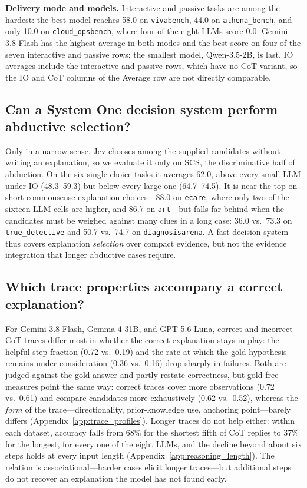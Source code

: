 \textbf{Delivery mode and models.} Interactive and passive tasks are among the hardest: the best model reaches 58.0 on \texttt{vivabench}, 44.0 on \texttt{athena\_bench}, and only 10.0 on \texttt{cloud\_opsbench}, where four of the eight LLMs score 0.0. Gemini-3.8-Flash has the highest average in both modes and the best score on four of the seven interactive and passive rows; the smallest model, Qwen-3.5-2B, is last. IO averages include the interactive and passive rows, which have no CoT variant, so the IO and CoT columns of the Average row are not directly comparable.

\subsection{Can a System One decision system perform abductive selection?}
\label{sec:jev}

Only in a narrow sense. Jev chooses among the supplied candidates without writing an explanation, so we evaluate it only on SCS, the discriminative half of abduction. On the six single-choice tasks it averages 62.0, above every small LLM under IO (48.3--59.3) but below every large one (64.7--74.5). It is near the top on short commonsense explanation choices---88.0 on \texttt{ecare}, where only two of the sixteen LLM cells are higher, and 86.7 on \texttt{art}---but falls far behind when the candidates must be weighed against many clues in a long case: 36.0 vs.\ 73.3 on \texttt{true\_detective} and 50.7 vs.\ 74.7 on \texttt{diagnosisarena}. A fast decision system thus covers explanation \emph{selection} over compact evidence, but not the evidence integration that longer abductive cases require.

\subsection{Which trace properties accompany a correct explanation?}
\label{sec:cognitive_profiles_and_quality_gap}
\label{sec:reasoning_length}

For Gemini-3.8-Flash, Gemma-4-31B, and GPT-5.6-Luna, correct and incorrect CoT traces differ most in whether the correct explanation stays in play: the helpful-step fraction (0.72 vs.\ 0.19) and the rate at which the gold hypothesis remains under consideration (0.36 vs.\ 0.16) drop sharply in failures. Both are judged against the gold answer and partly restate correctness, but gold-free measures point the same way: correct traces cover more observations (0.72 vs.\ 0.61) and compare candidates more exhaustively (0.62 vs.\ 0.52), whereas the \emph{form} of the trace---directionality, prior-knowledge use, anchoring point---barely differs (Appendix~\ref{app:trace_profiles}). Longer traces do not help either: within each dataset, accuracy falls from 68\% for the shortest fifth of CoT replies to 37\% for the longest, for every one of the eight LLMs, and the decline beyond about six steps holds at every input length (Appendix~\ref{app:reasoning_length}). The relation is associational---harder cases elicit longer traces---but additional steps do not recover an explanation the model has not found early.

